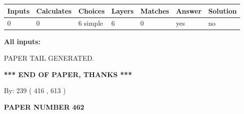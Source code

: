 \documentclass[12pt]{article}
\begin{document}
 
\noindent{}
 
 
   
   
   
   
\noindent\begin{tabular}{|l|l|l|l|l|l|l|}
 \hline
Inputs & Calculates & Choices & Layers & Matches & Answer & Solution \\ \hline
 0  & 
 0  & 
 6
  simple  
  & 
 6  & 
 0  & 
  yes & 
  no 
  \\ \hline
 \end{tabular}
   
   
   
   
\noindent{}
   
   
   
   
\noindent\vspace{0.1in}\hspace{-0.08in} {\textbf{\Large{All inputs: }}}
   
   
   
   
   
   
 \vspace{0.2in}
 
   
   
\vspace{2.0in} PAPER TAIL GENERATED.
   
   
   
   
\vspace{1.0in} 
{\textbf{\large{ *** END OF PAPER, THANKS *** }}} 
   
   
\hspace{1.0in} By: 
 239 ( 416 ,  613 )
   
   
   
   
\newpage 
\setcounter{page}{ 
   462001 } 
   
   
   
   
 {\textbf{ \Large{ PAPER NUMBER  462  }}}
   
   
\vspace{0.2in}
   
   
   
   
   
   
   
   
 \vspace{0.2in}
 
\end{document}
